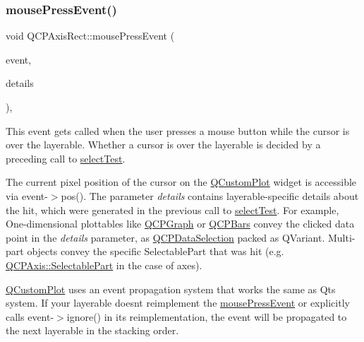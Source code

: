 \mbox{\label{classQCPAxisRect_aa9a7c807eaa4666870ac94aa6abc4dde}} 
\subsubsection{\texorpdfstring{mouse\+Press\+Event()}{mousePressEvent()}}
{\footnotesize\ttfamily void Q\+C\+P\+Axis\+Rect\+::mouse\+Press\+Event (\begin{DoxyParamCaption}\item[{Q\+Mouse\+Event $\ast$}]{event,  }\item[{const Q\+Variant \&}]{details }\end{DoxyParamCaption})\hspace{0.3cm}{\ttfamily [protected]}, {\ttfamily [virtual]}}

This event gets called when the user presses a mouse button while the cursor is over the layerable. Whether a cursor is over the layerable is decided by a preceding call to \hyperlink{classQCPLayoutElement_ae97f483cccedadbf18ea4525ef240ee4}{select\+Test}.

The current pixel position of the cursor on the \hyperlink{classQCustomPlot}{Q\+Custom\+Plot} widget is accessible via {\ttfamily event-\/$>$pos()}. The parameter {\itshape details} contains layerable-\/specific details about the hit, which were generated in the previous call to \hyperlink{classQCPLayoutElement_ae97f483cccedadbf18ea4525ef240ee4}{select\+Test}. For example, One-\/dimensional plottables like \hyperlink{classQCPGraph}{Q\+C\+P\+Graph} or \hyperlink{classQCPBars}{Q\+C\+P\+Bars} convey the clicked data point in the {\itshape details} parameter, as \hyperlink{classQCPDataSelection}{Q\+C\+P\+Data\+Selection} packed as Q\+Variant. Multi-\/part objects convey the specific {\ttfamily Selectable\+Part} that was hit (e.\+g. \hyperlink{classQCPAxis_abee4c7a54c468b1385dfce2c898b115f}{Q\+C\+P\+Axis\+::\+Selectable\+Part} in the case of axes).

\hyperlink{classQCustomPlot}{Q\+Custom\+Plot} uses an event propagation system that works the same as Qt\textquotesingle{}s system. If your layerable doesn\textquotesingle{}t reimplement the \hyperlink{classQCPAxisRect_aa9a7c807eaa4666870ac94aa6abc4dde}{mouse\+Press\+Event} or explicitly calls {\ttfamily event-\/$>$ignore()} in its reimplementation, the event will be propagated to the next layerable in the stacking order.

